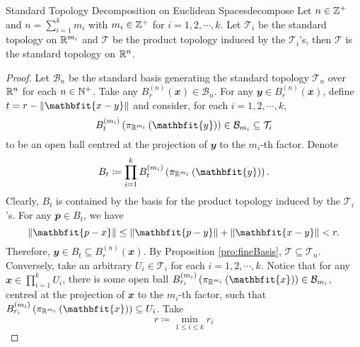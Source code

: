 \documentclass[math]{amznotes}
\theoremstyle{remark}
\begin{document}
\begin{probox}{Standard Topology Decomposition on Euclidean Spaces}{decompose}
    Let $n \in \mathbb{Z}^+$ and $n = \sum_{i = 1}^km_i$ with $m_i \in \mathbb{Z}^+$ for $i = 1, 2, \cdots, k$. Let $\mathcal{T}_i$ be the standard topology on $\mathbb{R}^{m_i}$ and $\mathcal{T}$ be the product topology induced by the $\mathcal{T}_i$'s, then $\mathcal{T}$ is the standard topology on $\mathbb{R}^n$.
    \tcblower
    \begin{proof}
        Let $\mathcal{B}_n$ be the standard basis generating the standard topology $\mathcal{T}_n$ over $\mathbb{R}^n$ for each $n \in \mathbb{N}^+$. Take any $B_r^{\left(n\right)}\left(\mathbfit{x}\right) \in \mathcal{B}_n$. For any $\mathbfit{y} \in B_r^{\left(n\right)}\left(\mathbfit{x}\right)$, define $t = r - \norm{\mathbfit{x - y}}$ and consider, for each $i = 1, 2, \cdots, k$,
        \begin{equation*}
            B_t^{\left(m_i\right)}\left(\pi_{\R^{m_i}}\left(\mathbfit{y}\right)\right) \in \mathcal{B}_{m_i} \subseteq \mathcal{T}_i
        \end{equation*}
        to be an open ball centred at the projection of $\mathbfit{y}$ to the $m_i$-th factor. Denote 
        \begin{equation*}
            B_t \coloneqq \prod_{i = 1}^{k}B_t^{\left(m_i\right)}\left(\pi_{\R^{m_i}}\left(\mathbfit{y}\right)\right).
        \end{equation*}
        Clearly, $B_t$ is contained by the basis for the product topology induced by the $\mathcal{T}_i$'s. For any $\mathbfit{p} \in B_t$, we have 
        \begin{equation*}
            \norm{\mathbfit{p - x}} \leq \norm{\mathbfit{p - y}} + \norm{\mathbfit{x - y}} < r.
        \end{equation*} 
        Therefore, $\mathbfit{y} \in B_t \subseteq B_r^{\left(n\right)}\left(\mathbfit{x}\right)$. By Proposition \ref{pro:fineBasis}, $\mathcal{T} \subseteq \mathcal{T}_n$. Conversely, take an arbitrary $U_i \in \mathcal{T}_i$ for each $i = 1, 2, \cdots, k$. Notice that for any $\mathbfit{x} \in \prod_{i = 1}^kU_i$, there is some open ball $B_{r_i}^{\left(m_i\right)}\left(\pi_{\R^{m_i}}\left(\mathbfit{x}\right)\right) \in \mathcal{B}_{m_i}$, centred at the projection of $\mathbfit{x}$ to the $m_i$-th factor, such that $B_{r_i}^{\left(m_i\right)}\left(\pi_{\R^{m_i}}\left(\mathbfit{x}\right)\right) \subseteq U_i$. Take
        \begin{equation*}
            r \coloneqq \min_{1 \leq i \leq k}r_i
        \end{equation*}

\end{proof}
\end{probox}
\end{document}
